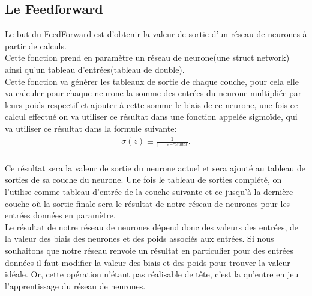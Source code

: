 \documentclass[14pt]{article}
\begin{document}
\subsection{Le Feedforward}
Le but du FeedForward est d'obtenir la valeur de sortie d'un réseau de neurones à partir de calculs.\\
Cette fonction prend en paramètre un réseau de neurone(une struct network) ainsi qu'un tableau d'entrées(tableau de double).\\
Cette fonction va générer les tableaux de sortie de chaque couche, pour cela elle va calculer pour chaque neurone la somme des entrées du neurone multipliée par leurs poids respectif et ajouter à cette somme le biais de ce neurone, une fois ce calcul effectué on va utiliser ce résultat dans une fonction appelée sigmoïde, qui va utiliser ce résultat dans la formule suivante:\\
\begin{eqnarray} 
  \sigma(z) \equiv \frac{1}{1+e^{-résultat}}.
\end{eqnarray}
\\

\newpage
Ce résultat sera la valeur de sortie du neurone actuel et sera ajouté au tableau de sorties de sa couche du neurone. Une fois le tableau de sorties complété, on l'utilise comme tableau d'entrée de la couche suivante et ce jusqu'à la dernière couche où la sortie finale sera le résultat de notre réseau de neurones pour les entrées données en paramètre.\\
Le résultat de notre réseau de neurones dépend donc des valeurs des entrées, de la valeur des biais des neurones et des poids associés aux entrées. Si nous souhaitons que notre réseau renvoie un résultat en particulier pour des entrées données il faut modifier la valeur des biais et des poids pour trouver la valeur idéale. Or, cette opération n'étant pas réalisable de tête, c'est la qu'entre en jeu l'apprentissage du réseau de neurones.
\newpage
\end{document}
